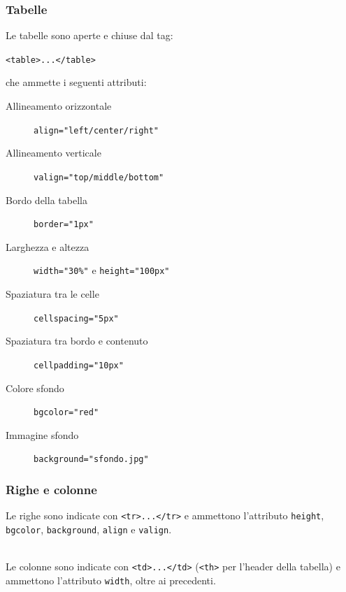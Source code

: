 \documentclass[]{beamer}
\begin{document}
\begin{frame}[fragile]
\frametitle{Tabelle}
Le tabelle sono aperte e chiuse dal tag:
\begin{center}
\texttt{<table>...</table>}
\end{center}
che ammette i seguenti attributi:
  \begin{description}
    \item[Allineamento orizzontale] \texttt{align="left/center/right"}
    \item[Allineamento verticale] \texttt{valign="top/middle/bottom"}
    \item[Bordo della tabella] \texttt{border="1px"}
    \item[Larghezza e altezza] \texttt{width="30\%"} e \texttt{height="100px"} 
    \item[Spaziatura tra le celle] \texttt{cellspacing="5px"}
    \item[Spaziatura tra bordo e contenuto] \texttt{cellpadding="10px"}
    \item[Colore sfondo] \texttt{bgcolor="red"}
    \item[Immagine sfondo] \texttt{background="sfondo.jpg"}
  \end{description}
\end{frame}




\begin{frame}[fragile]
\frametitle{Righe e colonne}
Le righe sono indicate con \texttt{<tr>...</tr>} e ammettono l'attributo \texttt{height}, \texttt{bgcolor}, \texttt{background}, \texttt{align} e \texttt{valign}.\\~\\\pause


Le colonne sono indicate con \texttt{<td>...</td>} (\texttt{<th>} per l'header della tabella) e ammettono l'attributo \texttt{width}, oltre ai precedenti.
\end{frame}
\end{document}
